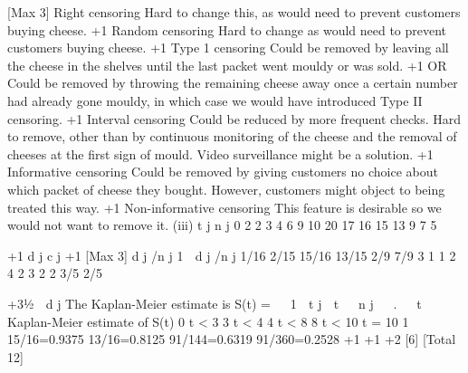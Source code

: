 \documentclass[a4paper,12pt]{article}
\begin{document}
[Max 3]
Right censoring
Hard to change this, as would need to prevent customers buying cheese.
+1
Random censoring
Hard to change as would need to prevent customers buying cheese.
+1
Type 1 censoring
Could be removed by leaving all the cheese in the shelves until the
last packet went mouldy or was sold.
+1
OR
Could be removed by throwing the remaining cheese away once a certain
number had already gone mouldy, in which case we would have
introduced Type II censoring.
+1
Interval censoring
Could be reduced by more frequent checks. Hard to remove,
other than by continuous monitoring of the cheese and the
removal of cheeses at the first sign of mould. Video surveillance
might be a solution.
+1
Informative censoring
Could be removed by giving customers no choice about which
packet of cheese they bought. However, customers
might object to being treated this way.
+1
Non-informative censoring
This feature is desirable so we would not want to remove it.
(iii)
t j n j
0
2
2
3
4
6
9
10 20
17
16
15
13
9
7
5

+1
d j
c j
+1
[Max 3]
d j /n j 1  d j /n j
1/16
2/15 15/16
13/15
2/9 7/9
3
1
1
2
4
2
3 2
2 3/5 2/5
   
+31⁄2
 d j
The Kaplan-Meier estimate is S(t) =   1 
t j  t 
 n j

 . 


t Kaplan-Meier estimate of S(t)
0 \leq t < 3
3 \leq t < 4
4 \leq t < 8
8 \leq t < 10
t = 10 1
15/16=0.9375
13/16=0.8125
91/144=0.6319
91/360=0.2528
+1 +1
+2
[6]
[Total 12]

\end{document}
